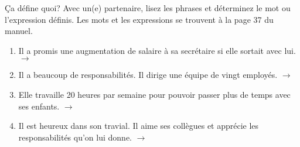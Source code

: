 \begin{frame}{Ça défine quoi?}
  Avec un(e) partenaire, lisez les phrases et déterminez le mot ou l'expression définis.
  Les mots et les expressions se trouvent à la page 37 du manuel.
  \begin{enumerate}
    \item Il a promis une augmentation de salaire à sa secrétaire si elle sortait avec lui. \hfill $\to$ \underline{}
    \item Il a beaucoup de responsabilités. Il dirige une équipe de vingt employés. \hfill $\to$ \underline{}
    \item Elle travaille 20 heures par semaine pour pouvoir passer plus de temps avec ses enfants. \hfill $\to$ \underline{}
    \item Il est heureux dans son travial. Il aime ses collègues et apprécie les responsabilités qu'on lui donne. \hfill $\to$ \underline{}
  \end{enumerate}
\end{frame}